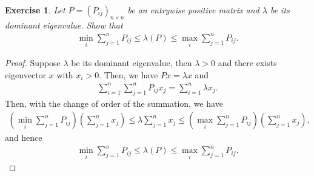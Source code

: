 \documentclass[11pt]{book}
\newtheorem{exercise}{Exercise}[section]
\theoremstyle{definition}
\numberwithin{equation}{chapter}
\begin{document}
\medskip

\begin{exercise}
Let $P = \left(P_{ij}\right)_{n\times n}$ be an entrywise positive matrix and $\lambda$ be its dominant eigenvalue. Show that 
\begin{align*}
    \min_{i} \sum^n_{j=1} P_{ij} \leq \lambda(P) \leq \max_{i} \sum^n_{j=1} P_{ij}.
\end{align*}
\end{exercise}
\begin{proof}
Suppose $\lambda$ be its dominant eigenvalue, then $\lambda > 0$ and there exists eigenvector $x$ with $x_i > 0$. Then, we have $Px = \lambda x$ and 
\begin{align*}
    \sum^n_{i=1}\sum^n_{j=1} P_{ij} x_j = \sum^n_{i=1} \lambda x_j.
\end{align*}
Then, with the change of order of the summation, we have 
\begin{align*}
    \left(\min_{i} \sum^n_{j=1} P_{ij} \right) \left(\sum^n_{j=1}x_j\right) \leq \lambda \sum^n_{j=1}x_j \leq \left(\max_{i} \sum^n_{j=1} P_{ij} \right) \left(\sum^n_{j=1}x_j\right),
\end{align*}
and hence
\begin{align*}
    \min_{i} \sum^n_{j=1} P_{ij} \leq \lambda(P) \leq \max_{i} \sum^n_{j=1} P_{ij}.
\end{align*}
\end{proof}

\medskip
\end{document}
